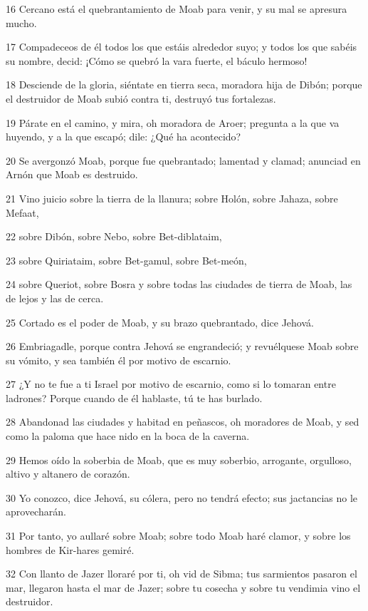 \par 16 Cercano está el quebrantamiento de Moab para venir, y su mal se apresura mucho.
\par 17 Compadeceos de él todos los que estáis alrededor suyo; y todos los que sabéis su nombre, decid: ¡Cómo se quebró la vara fuerte, el báculo hermoso!
\par 18 Desciende de la gloria, siéntate en tierra seca, moradora hija de Dibón; porque el destruidor de Moab subió contra ti, destruyó tus fortalezas.
\par 19 Párate en el camino, y mira, oh moradora de Aroer; pregunta a la que va huyendo, y a la que escapó; dile: ¿Qué ha acontecido?
\par 20 Se avergonzó Moab, porque fue quebrantado; lamentad y clamad; anunciad en Arnón que Moab es destruido.
\par 21 Vino juicio sobre la tierra de la llanura; sobre Holón, sobre Jahaza, sobre Mefaat,
\par 22 sobre Dibón, sobre Nebo, sobre Bet-diblataim,
\par 23 sobre Quiriataim, sobre Bet-gamul, sobre Bet-meón,
\par 24 sobre Queriot, sobre Bosra y sobre todas las ciudades de tierra de Moab, las de lejos y las de cerca.
\par 25 Cortado es el poder de Moab, y su brazo quebrantado, dice Jehová.
\par 26 Embriagadle, porque contra Jehová se engrandeció; y revuélquese Moab sobre su vómito, y sea también él por motivo de escarnio.
\par 27 ¿Y no te fue a ti Israel por motivo de escarnio, como si lo tomaran entre ladrones? Porque cuando de él hablaste, tú te has burlado.
\par 28 Abandonad las ciudades y habitad en peñascos, oh moradores de Moab, y sed como la paloma que hace nido en la boca de la caverna.
\par 29 Hemos oído la soberbia de Moab, que es muy soberbio, arrogante, orgulloso, altivo y altanero de corazón.
\par 30 Yo conozco, dice Jehová, su cólera, pero no tendrá efecto; sus jactancias no le aprovecharán.
\par 31 Por tanto, yo aullaré sobre Moab; sobre todo Moab haré clamor, y sobre los hombres de Kir-hares gemiré.
\par 32 Con llanto de Jazer lloraré por ti, oh vid de Sibma; tus sarmientos pasaron el mar, llegaron hasta el mar de Jazer; sobre tu cosecha y sobre tu vendimia vino el destruidor.
